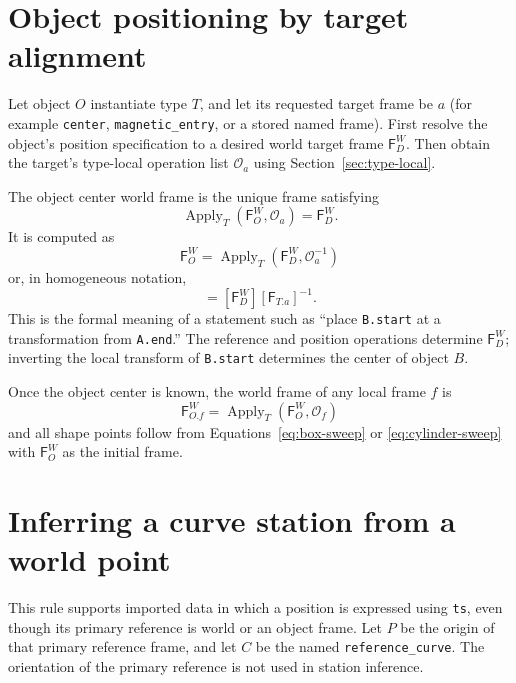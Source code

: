 \documentclass[11pt,a4paper]{article}
\newcommand{\Frame}{\mathsf{F}}
\newcommand{\Apply}{\operatorname{Apply}}
\newcommand{\ops}{\mathcal{O}}
\begin{document}
\section{Object positioning by target alignment}
\label{sec:object-alignment}

Let object $O$ instantiate type $T$, and let its requested target frame be
$a$ (for example \texttt{center}, \texttt{magnetic\_entry}, or a stored named
frame).  First resolve the object's position specification to a desired world
target frame $\Frame_D^W$.  Then obtain the target's type-local operation list
$\ops_a$ using Section~\ref{sec:type-local}.

The object center world frame is the unique frame satisfying
\begin{equation}
  \Apply_T(\Frame_O^W,\ops_a)=\Frame_D^W.
  \label{eq:target-constraint}
\end{equation}
It is computed as
\begin{equation}
  \boxed{\Frame_O^W=\Apply_T(\Frame_D^W,\ops_a^{-1})}
  \label{eq:object-frame}
\end{equation}
or, in homogeneous notation,
\begin{equation}
  [\Frame_O^W]=[\Frame_D^W][\Frame_{T.a}]^{-1}.
\end{equation}
This is the formal meaning of a statement such as ``place \texttt{B.start} at
a transformation from \texttt{A.end}.''  The reference and position operations
determine $\Frame_D^W$; inverting the local transform of \texttt{B.start}
determines the center of object $B$.

Once the object center is known, the world frame of any local frame $f$ is
\begin{equation}
  \boxed{\Frame_{O.f}^W=\Apply_T(\Frame_O^W,\ops_f)}
  \label{eq:frame-world-frame}
\end{equation}
and all shape points follow from Equations~\eqref{eq:box-sweep} or
\eqref{eq:cylinder-sweep} with $\Frame_O^W$ as the initial frame.

\section{Inferring a curve station from a world point}
\label{sec:s-inference}

This rule supports imported data in which a position is expressed using
\texttt{ts}, even though its primary reference is world or an object frame.
Let $P$ be the origin of that primary reference frame, and let $C$ be the named
\texttt{reference\_curve}.  The orientation of the primary reference is not
used in station inference.
\end{document}
